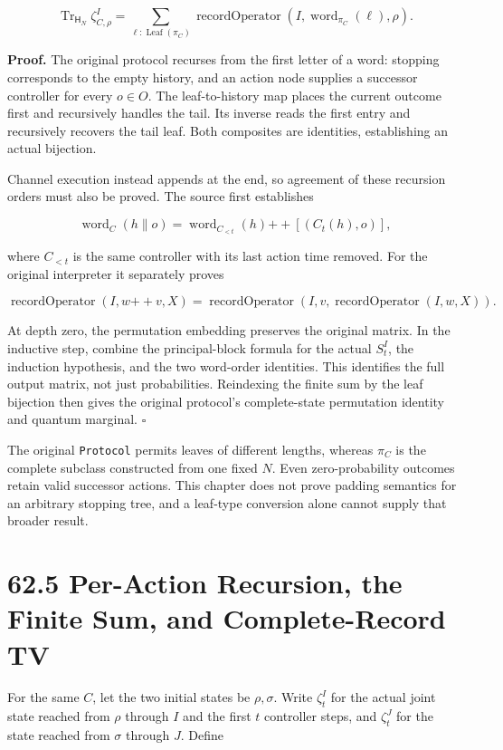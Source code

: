 \documentclass[
  11pt,
  oneside]{book}
\begin{document}
\[
\operatorname{Tr}_{\mathsf H_N}\zeta^I_{C,\rho}
=\sum_{\ell:\operatorname{Leaf}(\pi_C)}
 \operatorname{recordOperator}(I,\operatorname{word}_{\pi_C}(\ell),\rho).
\]

\textbf{Proof.} The original protocol recurses from the first letter of
a word: stopping corresponds to the empty history, and an action node
supplies a successor controller for every \(o\in O\). The
leaf-to-history map places the current outcome first and recursively
handles the tail. Its inverse reads the first entry and recursively
recovers the tail leaf. Both composites are identities, establishing an
actual bijection.

Channel execution instead appends at the end, so agreement of these
recursion orders must also be proved. The source first establishes

\[
\operatorname{word}_{C}(h\|o)
=\operatorname{word}_{C_{<t}}(h)
 \mathbin{+\!+}[(C_t(h),o)],
\]

where \(C_{<t}\) is the same controller with its last action time
removed. For the original interpreter it separately proves

\[
\operatorname{recordOperator}(I,w\mathbin{+\!+}v,X)
=\operatorname{recordOperator}
  (I,v,\operatorname{recordOperator}(I,w,X)).
\]

At depth zero, the permutation embedding preserves the original matrix.
In the inductive step, combine the principal-block formula for the
actual \(S^I_t\), the induction hypothesis, and the two word-order
identities. This identifies the full output matrix, not just
probabilities. Reindexing the finite sum by the leaf bijection then
gives the original protocol's complete-state permutation identity and
quantum marginal. \(\square\)

The original \texttt{Protocol} permits leaves of different lengths,
whereas \(\pi_C\) is the complete subclass constructed from one fixed
\(N\). Even zero-probability outcomes retain valid successor actions.
This chapter does not prove padding semantics for an arbitrary stopping
tree, and a leaf-type conversion alone cannot supply that broader
result.

\section{62.5 Per-Action Recursion, the Finite Sum, and Complete-Record
TV}

For the same \(C\), let the two initial states be \(\rho,\sigma\). Write
\(\zeta^I_t\) for the actual joint state reached from \(\rho\) through
\(I\) and the first \(t\) controller steps, and \(\zeta^J_t\) for the
state reached from \(\sigma\) through \(J\). Define
\end{document}
